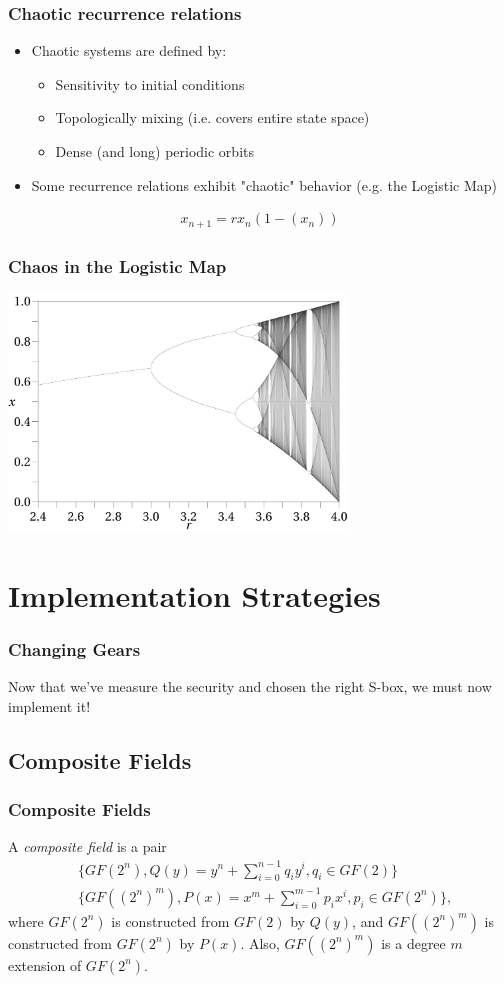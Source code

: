 \documentclass[handout]{beamer}
\begin{document}
\begin{frame}
	\frametitle{Chaotic recurrence relations}
	\begin{itemize}
		\item Chaotic systems are defined by:
		\begin{itemize}
			\item Sensitivity to initial conditions 
			\item Topologically mixing (i.e. covers entire state space)
			\item Dense (and long) periodic orbits 
		\end{itemize}
		\item Some recurrence relations exhibit "chaotic" behavior (e.g. the Logistic Map)
	\end{itemize}
	\begin{eqnarray*}
		x_{n+1} = rx_{n}(1 - (x_{n}))
		\label{logisticmap}
	\end{eqnarray*}
\end{frame}

\begin{frame}
	\frametitle{Chaos in the Logistic Map}
	\begin{center}
      		\includegraphics[width=90mm]{images/logistic_bifurcation.png}
	\end{center}
\end{frame}

\section{Implementation Strategies}
\begin{frame}
\frametitle{Changing Gears}
Now that we've measure the security and chosen the right S-box, we must now implement it!
\end{frame}

\subsection{Composite Fields}
\begin{frame}
	\frametitle{Composite Fields}
	A \emph{composite field} is a pair 
	\begin{align*}
	& \{GF(2^n), Q(y) = y^n + \sum_{i=0}^{n-1}q_iy^i, q_i \in GF(2)\} \\
	& \{GF((2^n)^m), P(x) = x^m + \sum_{i=0}^{m-1}p_ix^i, p_i \in GF(2^n)\},
	\end{align*}
	where $GF(2^n)$ is constructed from $GF(2)$ by $Q(y)$, and $GF((2^n)^m)$ is
	constructed from $GF(2^n)$ by $P(x)$. Also, $GF((2^n)^m)$ is a degree $m$ extension
	of $GF(2^n)$.
\end{frame}
\end{document}

